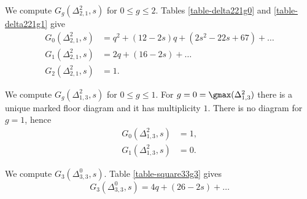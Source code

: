 \begin{exam} \label{ex-delta221}
We compute $G_g(\Delta^2_{2,1},s)$ for $0\leqslant g \leqslant 2$. Tables \ref{table-delta221g0} and \ref{table-delta221g1} give
\begin{align*}
    G_0(\Delta^2_{2,1},s) &=  q^2 + (12-2s)q + (2s^2-22s+67) + \dots \\
    G_1(\Delta^2_{2,1},s) &= 2q + (16-2s) + \dots\\
    G_2(\Delta^2_{2,1},s) &= 1. 
\end{align*} 
\end{exam}



\begin{exam} \label{ex-delta213}
We compute $G_g(\Delta^2_{1,3},s)$ for $0\leqslant g \leqslant 1$. For $g=0=\gmax(\Delta^2_{1,3})$ there is a unique marked floor diagram and it has multiplicity $1$. There is no diagram for $g=1$, hence
\begin{align*}
    G_0(\Delta^2_{1,3},s) &= 1, \\
    G_1(\Delta^2_{1,3},s) &= 0. 
\end{align*} 
\end{exam}



\begin{exam} \label{ex-square33}
We compute $G_3(\Delta^0_{3,3},s)$. Table \ref{table-square33g3} gives
\[ G_3(\Delta^0_{3,3},s) = 4q + (26-2s) + \dots  \]
\end{exam}

